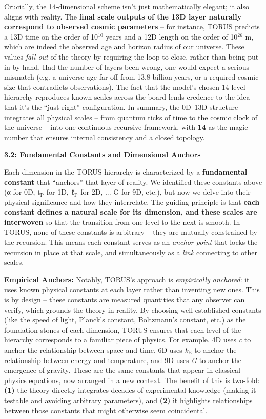 \documentclass[]{article}
\newcommand{\subscript}[1]{\ensuremath{_{\mathrm{#1}}}}
\newcommand{\superscript}[1]{\ensuremath{^{\mathrm{#1}}}}
\begin{document}
Crucially, the 14-dimensional scheme isn't just mathematically elegant;
it also aligns with reality. The \textbf{final scale outputs of the 13D
layer naturally correspond to observed cosmic parameters} -- for
instance, TORUS predicts a 13D time on the order of 10\superscript{10} years and a
12D length on the order of 10\superscript{26} m, which are indeed the observed age
and horizon radius of our universe​. These values \emph{fall out} of the
theory by requiring the loop to close, rather than being put in by hand.
Had the number of layers been wrong, one would expect a serious mismatch
(e.g. a universe age far off from 13.8 billion years, or a required
cosmic size that contradicts observations). The fact that the model's
chosen 14-level hierarchy reproduces known scales across the board lends
credence to the idea that it's the ``just right'' configuration. In
summary, the 0D--13D structure integrates all physical scales -- from
quantum ticks of time to the cosmic clock of the universe -- into one
continuous recursive framework, with \textbf{14} as the magic number
that ensures internal consistency and a closed topology​.

\textbf{3.2: Fundamental Constants and Dimensional Anchors}

Each dimension in the TORUS hierarchy is characterized by a
\textbf{fundamental constant} that ``anchors'' that layer of reality. We
identified these constants above (α for 0D,
t\subscript{P} for 1D,
ℓ\subscript{P} for 2D, ...
G for 9D, etc.), but now we delve into their physical significance and
how they interrelate. The guiding principle is that \textbf{each
constant defines a natural scale for its dimension, and these scales are
interwoven} so that the transition from one level to the next is smooth.
In TORUS, none of these constants is arbitrary -- they are mutually
constrained by the recursion. This means each constant serves as an
\emph{anchor point} that locks the recursion in place at that scale, and
simultaneously as a \emph{link} connecting to other scales.

\textbf{Empirical Anchors:} Notably, TORUS's approach is
\emph{empirically anchored}: it uses known physical constants at each
layer rather than inventing new ones. This is by design -- these
constants are measured quantities that any observer can verify, which
grounds the theory in reality​. By choosing well-established constants
(like the speed of light, Planck's constant, Boltzmann's constant, etc.)
as the foundation stones of each dimension, TORUS ensures that each
level of the hierarchy corresponds to a familiar piece of physics. For
example, 4D uses \emph{c} to anchor the relationship between space and
time, 6D uses
\emph{k\subscript{B}} to
anchor the relationship between energy and temperature, and 9D uses
\emph{G} to anchor the emergence of gravity. These are the same
constants that appear in classical physics equations, now arranged in a
new context. The benefit of this is two-fold: \textbf{(1)} the theory
directly integrates decades of experimental knowledge (making it
testable and avoiding arbitrary parameters), and \textbf{(2)} it
highlights relationships between those constants that might otherwise
seem coincidental.
\end{document}
